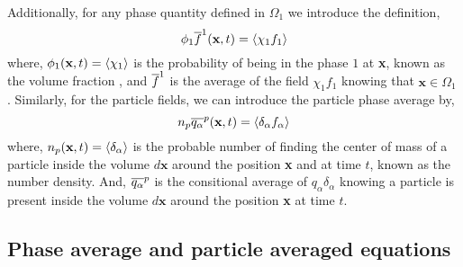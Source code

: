 Additionally, for any phase quantity defined in $\Omega_1$ we introduce the definition, 
\begin{equation}
    \phi_1\overline{f}^1(\textbf{x},t) = \left<\chi_1 f_1\right>
    \label{eq:1_avg}
\end{equation}
where, $\phi_1(\textbf{x},t) = \left<\chi_1\right>$ is the probability of being in the phase $1$ at \textbf{x}, known as the volume fraction , and 
$\overline{f}^1$ is the average of the field $\chi_1 f_1$ knowing that $\textbf{x}\in \Omega_1$ . 
Similarly, for the particle fields, we can introduce the particle phase average by,
\begin{equation}
     n_p\overline{q_\alpha}^{p}(\textbf{x},t) = \left<\delta_\alpha f_\alpha\right>
     \label{eq:p_avg}
\end{equation}
where, $n_p(\textbf{x},t) = \left<\delta_\alpha\right>$ is the probable number of finding the center of mass of a particle inside the volume $d\textbf{x}$ around the position \textbf{x} and  at time $t$, known as the number density. 
And, $\overline{q_\alpha}^{p}$ is the consitional average of $q_\alpha\delta_\alpha$ knowing a particle is present inside the volume $d\textbf{x}$ around the position \textbf{x} at time $t$. 

\subsection{Phase average and particle averaged equations}

